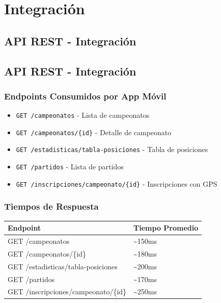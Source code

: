 \documentclass[
  spanish,
  11pt,
  letterpaper,
]{book}
\providecommand{\tightlist}{%
  \setlength{\itemsep}{0pt}\setlength{\parskip}{0pt}}
\begin{document}
\part{Integración}

\chapter{API REST - Integración}\label{api-rest---integraciuxf3n}

\chapter{API REST - Integración}\label{api-rest---integraciuxf3n-1}

\section{Endpoints Consumidos por App
Móvil}\label{endpoints-consumidos-por-app-muxf3vil}

\begin{itemize}
\tightlist
\item
  \texttt{GET\ /campeonatos} - Lista de campeonatos
\item
  \texttt{GET\ /campeonatos/\{id\}} - Detalle de campeonato
\item
  \texttt{GET\ /estadisticas/tabla-posiciones} - Tabla de posiciones
\item
  \texttt{GET\ /partidos} - Lista de partidos
\item
  \texttt{GET\ /inscripciones/campeonato/\{id\}} - Inscripciones con GPS
\end{itemize}

\section{Tiempos de Respuesta}\label{tiempos-de-respuesta}

\begin{longtable}[]{@{}ll@{}}
\toprule\noalign{}
Endpoint & Tiempo Promedio \\
\midrule\noalign{}
\endhead
\bottomrule\noalign{}
\endlastfoot
GET /campeonatos & \textasciitilde150ms \\
GET /campeonatos/\{id\} & \textasciitilde180ms \\
GET /estadisticas/tabla-posiciones & \textasciitilde200ms \\
GET /partidos & \textasciitilde170ms \\
GET /inscripciones/campeonato/\{id\} & \textasciitilde250ms \\
\end{longtable}
\end{document}
